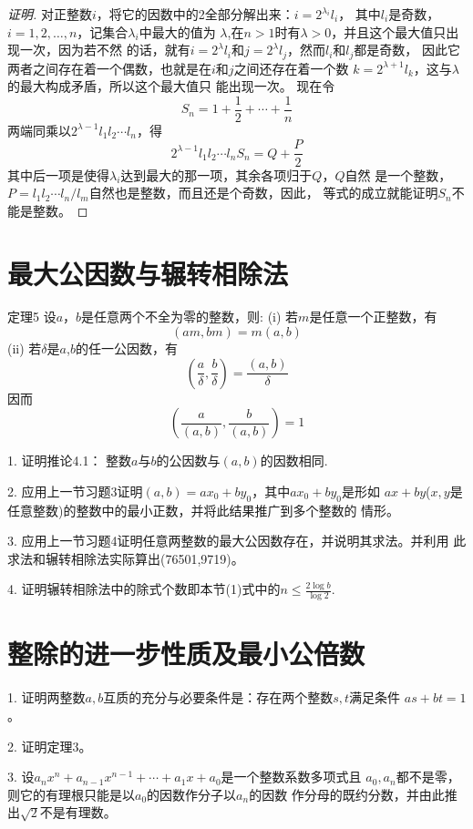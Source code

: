 \begin{proof}[证明]
对正整数$i$，将它的因数中的2全部分解出来：$i=2^{\lambda_i}l_i$，
其中$l_i$是奇数，$i=1,2,\dots,n$，记集合${\lambda_i}$中最大的值为
$\lambda$,在$n>1$时有$\lambda>0$，并且这个最大值只出现一次，因为若不然
的话，就有$i=2^{\lambda}l_i$和$j=2^{\lambda}l_j$，然而$l_i$和$l_j$都是奇数，
因此它两者之间存在着一个偶数，也就是在$i$和$j$之间还存在着一个数
$k=2^{\lambda + 1}l_k$，这与$\lambda$的最大构成矛盾，所以这个最大值只
能出现一次。
现在令
\begin{displaymath}
  S_n=1+\frac{1}{2}+\cdots + \frac{1}{n}
\end{displaymath}
两端同乘以$2^{\lambda-1}l_1l_2\cdots l_n$，得
\begin{displaymath}
  2^{\lambda-1}l_1l_2\cdots l_nS_n=Q+\frac{P}{2}
\end{displaymath}
其中后一项是使得$\lambda_i$达到最大的那一项，其余各项归于$Q$，$Q$自然
是一个整数，$P=l_1l_2\cdots l_n/l_m$自然也是整数，而且还是个奇数，因此，
等式的成立就能证明$S_n$不能是整数。
\end{proof}

\section{最大公因数与辗转相除法}

定理5 设$a$，$b$是任意两个不全为零的整数，则:
(i) 若$m$是任意一个正整数，有
\begin{displaymath}
  (am,bm)=m(a,b)
\end{displaymath}
(ii) 若$\delta $是$a$,$b$的任一公因数，有
\begin{displaymath}
  (\frac{a}{\delta},\frac{b}{\delta})=\frac{(a,b)}{\delta}
\end{displaymath}
因而
\begin{displaymath}
  (\frac{a}{(a,b)},\frac{b}{(a,b)})=1
\end{displaymath}

1. 证明推论4.1： 整数$a$与$b$的公因数与$(a,b)$的因数相同.

2. 应用上一节习题3证明$(a,b)=ax_0+by_0$，其中$ax_0+by_0$是形如
$ax+by$($x,y$是任意整数)的整数中的最小正数，并将此结果推广到多个整数的
情形。

3. 应用上一节习题4证明任意两整数的最大公因数存在，并说明其求法。并利用
此求法和辗转相除法实际算出(76501,9719)。

4. 证明辗转相除法中的除式个数即本节(1)式中的$n\leqslant \frac{2\log{b}}{\log{2}}$.


\section{整除的进一步性质及最小公倍数}

1. 证明两整数$a,b$互质的充分与必要条件是：存在两个整数$s,t$满足条件
$as+bt=1$。

2. 证明定理3。

3. 设$a_nx^n+a_{n-1}x^{n-1}+\cdots+a_1x+a_0$是一个整数系数多项式且
$a_0,a_n$都不是零，则它的有理根只能是以$a_0$的因数作分子以$a_n$的因数
作分母的既约分数，并由此推出$\sqrt{2}$不是有理数。